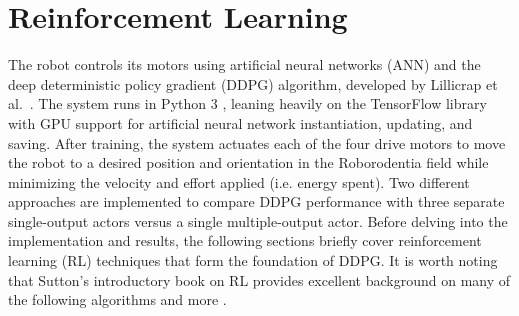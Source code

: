 \chapter{Reinforcement Learning}
The robot controls its motors using artificial neural networks (ANN) and the deep deterministic policy gradient (DDPG) algorithm, developed by Lillicrap et al.\ \cite{lillicrap_2016}. The system runs in Python 3 \cite{python3}, leaning heavily on the TensorFlow library with GPU support \cite{tensorflow} for artificial neural network instantiation, updating, and saving. After training, the system actuates each of the four drive motors to move the robot to a desired position and orientation in the Roborodentia field while minimizing the velocity and effort applied (i.e. energy spent). Two different approaches are implemented to compare DDPG performance with three separate single-output actors versus a single multiple-output actor. Before delving into the implementation and results, the following sections briefly cover reinforcement learning (RL) techniques that form the foundation of DDPG. It is worth noting that Sutton's introductory book on RL provides excellent background on many of the following algorithms and more \cite{sutton_2017}. 

